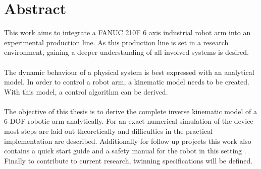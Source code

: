 \chapter{Abstract}

This work aims to integrate a FANUC 210F 6 axis industrial robot arm  into an experimental production line. 
As this production line is set in a research environment, gaining a deeper understanding of all involved systems is desired.\\
\\
The dynamic behaviour of a physical system is best expressed with an analytical model.
In order to control a robot arm, a kinematic model needs to be created. With this model, a control algorithm can be derived.\\
\\
The objective of this thesis is to derive the complete inverse kinematic model of a 6 \ac{DOF} robotic arm analytically. For an exact numerical simulation of the device most steps are laid out theoretically and difficulties in the practical implementation are described.
Additionally for follow up projects this work also contains a quick start guide and a safety manual for the robot in this setting .
Finally to contribute to current research, twinning specifications will be defined.


